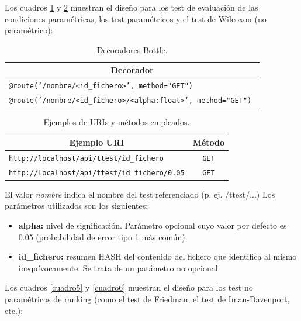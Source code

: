 Los cuadros \ref{cuadro3} y \ref{cuadro4} muestran el diseño para los test de evaluación de las condiciones paramétricas, los test paramétricos y el test de Wilcoxon (no paramétrico):

\begin{table}[H]
	\centering
	\begin{tabular}{|l|}
		\hline
		\multicolumn{1}{|c|}{\textbf{Decorador}} \\ \hline
		\texttt{@route('/nombre/<id\_fichero>', method="GET")} \\ \hline
		\texttt{@route('/nombre/<id\_fichero>/<alpha:float>', method="GET") } \\ \hline
	\end{tabular}
	\caption{Decoradores Bottle.}
	\label{cuadro3}
\end{table}

\begin{table}[H]
	\centering
	\begin{tabular}{|l|c|}
		\hline
		\multicolumn{1}{|c|}{\textbf{Ejemplo URI}} & {\textbf{Método}} \\ \hline
		\texttt{http://localhost/api/ttest/id\_fichero} & \texttt{GET} \\ \hline
		\texttt{http://localhost/api/ttest/id\_fichero/0.05} & \texttt{GET} \\ \hline
	\end{tabular}
	\caption{Ejemplos de URIs y métodos empleados.}
	\label{cuadro4}
\end{table}

El valor \textit{nombre} indica el nombre del test referenciado (p. ej. /ttest/...) Los parámetros utilizados son los siguientes:
\begin{itemize}
\item \textbf{alpha:} nivel de significación. Parámetro opcional cuyo valor por defecto es 0.05 (probabilidad de error tipo 1 más común).
\item \textbf{id\_fichero:} resumen HASH del contenido del fichero que identifica al mismo inequívocamente. Se trata de un parámetro no opcional.
\end{itemize}

Los cuadros \ref{cuadro5} y \ref{cuadro6} muestran el diseño para los test no paramétricos de ranking (como el test de Friedman, el test de Iman-Davenport, etc.):

